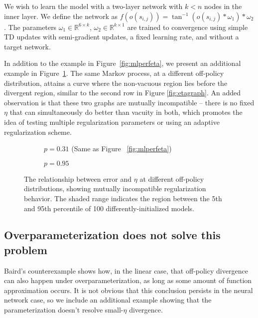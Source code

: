 We wish to learn the model with a two-layer network with $k < n$ nodes in the inner layer.
We define the network as $f(o(s_{i,j})) = \tan^{-1}(o(s_{i, j}) * \omega_1) * \omega_2$. The parameters $\omega_1 \in \mathbb R^{6\times k}$, $\omega_2 \in \mathbb R^{k \times 1}$ are trained to convergence using simple TD updates with semi-gradient updates, a fixed learning rate, and without a target network.

In addition to the example in Figure~\ref{fig:mlperfeta}, we present an additional example in Figure~\ref{fig:twomultilayerperfs}. The same Markov process, at a different off-policy distribution, attains a curve where the non-vacuous region lies before the divergent region, similar to the second row in Figure \ref{fig:etagraph}. An added observation is that these two graphs are mutually incompatible -- there is no fixed $\eta$ that can simultaneously do better than vacuity in both, which promotes the idea of testing multiple regularization parameters or using an adaptive regularization scheme.

\begin{figure}[b]
  \begin{subfigure}[t]{0.48\textwidth}
    \centering
    
    \caption{$p=0.31$ (Same as Figure~
      \ref{fig:mlperfeta})}
  \end{subfigure}
  \hfill
  \begin{subfigure}[t]{0.48\textwidth}
    \centering
    
    \caption{$p=0.95$}
  \end{subfigure}
  \caption{The relationship between error and $\eta$ at different off-policy distributions, showing mutually incompatible regularization behavior. The shaded range indicates the region between the 5th and 95th percentile of 100 differently-initialized models. }
  \label{fig:twomultilayerperfs}
\end{figure}

\subsection{Overparameterization does not solve this problem}

Baird's counterexample \cite{baird1993counterexample} shows how, in the linear case, that off-policy divergence can also happen under overparameterization, as long as some amount of function approximation occurs. It is not obvious that this conclusion persists in the neural network case, so we include an additional example showing that the parameterization doesn't resolve small-$\eta$ divergence.

